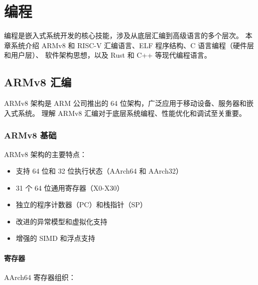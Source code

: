 \chapter{编程}

编程是嵌入式系统开发的核心技能，涉及从底层汇编到高级语言的多个层次。
本章系统介绍 ARMv8 和 RISC-V 汇编语言、ELF 程序结构、C 语言编程（硬件层和用户层）、
软件架构思想，以及 Rust 和 C++ 等现代编程语言。

\section{ARMv8 汇编}

ARMv8 架构是 ARM 公司推出的 64 位架构，广泛应用于移动设备、服务器和嵌入式系统。
理解 ARMv8 汇编对于底层系统编程、性能优化和调试至关重要。

\subsection{ARMv8 基础}


ARMv8 架构的主要特点：
\begin{itemize}
  \item 支持 64 位和 32 位执行状态（AArch64 和 AArch32）
  \item 31 个 64 位通用寄存器（X0-X30）
  \item 独立的程序计数器（PC）和栈指针（SP）
  \item 改进的异常模型和虚拟化支持
  \item 增强的 SIMD 和浮点支持
\end{itemize}

\subsubsection{寄存器}

AArch64 寄存器组织：


